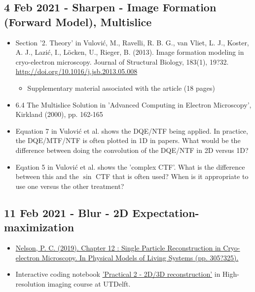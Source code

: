 \documentclass[11pt, oneside]{article}   	%
\begin{document}
\subsection{4 Feb 2021 - Sharpen - Image Formation (Forward Model), Multislice}
\begin{itemize}
	\item Section '2. Theory' in Vulovi\'{c}, M., Ravelli, R. B. G., van Vliet, L. J., Koster, A. J., Lazi\'{c}, I., L\"ocken, U., Rieger, B. (2013). Image formation modeling in cryo-electron microscopy. Journal of Structural Biology, 183(1), 19?32. \url{http://doi.org/10.1016/j.jsb.2013.05.008}
	\begin{itemize}
		\item Supplementary material associated with the article (18 pages)
	\end{itemize}
	\item 6.4 The Multislice Solution in 'Advanced Computing in Electron Microscopy', Kirkland (2000), pp. 162-165
\end{itemize}
\begin{itemize}
	\item Equation 7 in Vulovi\'{c} et al. shows the DQE/NTF being applied. In practice, the DQE/MTF/NTF is often plotted in 1D in papers. What would be the difference between doing the convolution of the DQE/NTF in 2D versus 1D?
	\item Eqation 5 in Vulovi\'{c} et al. shows the 'complex CTF'. What is the difference between this and the $\sin$ CTF that is often used? When is it appropriate to use one versus the other treatment?
\end{itemize}

\pagebreak
\subsection{11 Feb 2021 - Blur - 2D Expectation-maximization}
\begin{itemize}
	\item \href{https://repository.upenn.edu/cgi/viewcontent.cgi?article=1665&context=physics_papers}{Nelson, P. C. (2019). Chapter 12 : Single Particle Reconstruction in Cryo-electron Microscopy. In Physical Models of Living Systems (pp. 305?325).}
	\item Interactive coding notebook \href{https://gitlab.tudelft.nl/aj-lab/teaching/-/wikis/NB4020}{'Practical 2 - 2D/3D reconstruction'} in High-resolution imaging course at UTDelft.
\end{itemize}
\end{document}
